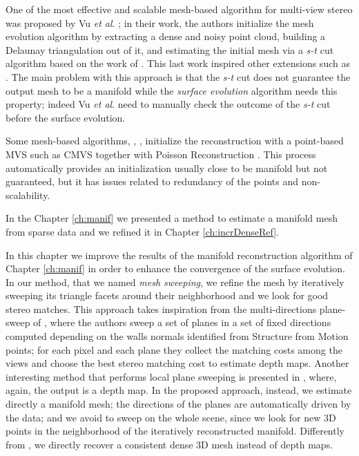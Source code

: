 One of the most effective and scalable mesh-based algorithm for multi-view stereo was proposed by Vu \emph{et al}. \cite{vu_et_al_2012}; in their work, the authors initialize the mesh evolution algorithm by extracting a dense and noisy point cloud, building a Delaunay triangulation out of it, and estimating the initial mesh via a \emph{s-t} cut algorithm based on the work of \cite{labatut2007efficient}. 
This last work inspired other extensions such as \cite{jancosek2011multi}.
The main problem with this approach is that the \emph{s-t} cut does not guarantee the output mesh to be a manifold while the \emph{surface evolution} algorithm needs this property; indeed Vu \emph{et al}.  need to manually check the outcome of the \emph{s-t} cut before the surface evolution.

Some mesh-based algorithms, \eg, \cite{pan2015automatic,li2015detail}, initialize the reconstruction with a point-based MVS such as CMVS \cite{fu10} together with Poisson Reconstruction \cite{kazhdan2006poisson}.
This process automatically provides an initialization usually close to be manifold but not guaranteed, but it has issues related to redundancy of the points and non-scalability.

In the Chapter \ref{ch:manif} we presented a method   to estimate a manifold mesh  from sparse data and we refined it in Chapter \ref{ch:incrDenseRef}. 

In this chapter we improve the results of the manifold reconstruction algorithm of Chapter \ref{ch:manif} in order to enhance the convergence of the surface evolution.
In our method, that we named \emph{mesh sweeping}, we refine the mesh by iteratively sweeping its triangle facets around their neighborhood and we look for good stereo matches.
This approach takes inspiration from the multi-directions plane-sweep of \cite{gallup2007real}, where the authors sweep a set of planes in a set of fixed directions computed depending on the walls normals identified from Structure from Motion points; for each pixel and each plane they collect the matching costs among the views and choose the best stereo matching cost to estimate depth maps.
Another interesting method that performs local plane sweeping is presented in \cite{sinha2014efficient}, where, again, the output is a depth map.
In the proposed approach, instead, we estimate directly a manifold mesh; the directions of the planes are automatically driven by the data; and we avoid to sweep on the whole scene, since we look for new 3D points in the neighborhood of the iteratively reconstructed manifold. 
Differently from \cite{gallup2007real}, we directly recover a consistent dense 3D mesh instead of depth maps.


